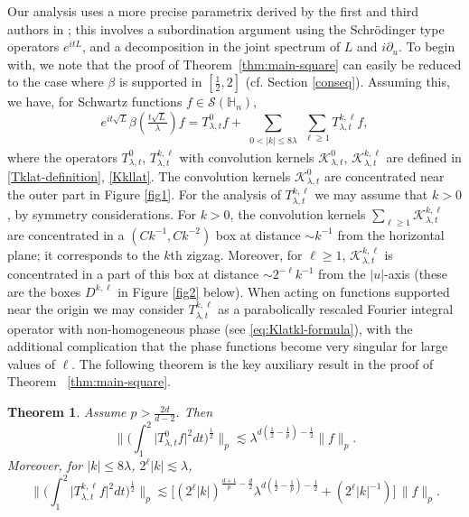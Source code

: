 \documentclass[leqno]{amsart}
\newtheorem{theorem}{Theorem}[section]
\theoremstyle{definition}
\theoremstyle{remark}
\numberwithin{equation}{section}
\newcommand\lc{\lesssim}
\newcommand\la{{\lambda}}
\newcommand\bbH{{\mathbb {H}}}
\newcommand\cS{{\mathcal {S}}}
\newcommand\sK{{\mathscr {K}}}
\begin{document}
Our analysis uses a more precise parametrix derived by the first and third authors in \cite{MuellerSeeger2015}; this involves a subordination argument using the Schrödinger type operators $e^{itL}$, and a decomposition in the joint spectrum of $L$ and $i\partial_u$. To begin with, we note that the proof of Theorem~\ref{thm:main-square} can easily be reduced to the case where $\beta$ is supported in $[\frac12,2]$ (cf. Section \ref{conseq}). Assuming this,  we have, for Schwartz functions $f\in \cS(\bbH_n)$,
\begin{equation}\label{eq:wavedec} e^{i t\sqrt{L}} \beta(\tfrac{t\sqrt{L}}{\la}) f= T^0_{\la,t}f +
\sum_{\substack {0<|k|\le 8\lambda} } \sum_{\ell\ge 1} T^{k,\ell}_{\la,t} f,
\end{equation}
where the  operators $T^0_{\la,t}$, $T^{k,\ell}_{\la,t}$ with convolution kernels $\sK^0_{\la,t}$, $\sK^{k,\ell}_{\la,t}$ are defined in  \eqref{Tklat-definition}, \eqref{Kkllat}.
The convolution kernels $\sK^0_{\la,t}$ are concentrated near the outer part in Figure \ref{fig1}. For the analysis of $T^{k,\ell}_{\la,t}$ we may assume that $k>0$, by symmetry considerations. 
For $k>0$,  the convolution kernels  $\sum_{\ell\ge 1} \sK_{\la,t}^{k,\ell}$  are concentrated  in a
$(Ck^{-1}, Ck^{-2} )$ box at distance $\sim k^{-1}$  from the horizontal plane; it corresponds to the $k$th zigzag. Moreover, for $\ell\ge 1$,  $\sK_{\la,t}^{k,\ell}$ is concentrated in a  part of this box at distance $\sim 2^{-\ell} k^{-1}$ from the $|u|$-axis (these are the boxes $D^{k,\ell}$ in Figure \ref{fig2} below). 
When acting on functions supported near the origin we may  consider $T^{k,\ell}_{\la,t}$ as a parabolically rescaled Fourier integral operator with non-homogeneous phase (see \eqref{eq:Klatkl-formula}), with the additional complication that the phase functions  become very singular for large values of $\ell$. The following theorem 
is  the key auxiliary result in the proof of Theorem~
\ref{thm:main-square}. 
\begin{theorem} \label{mainTklthm}
Assume $p>\frac{2d}{d-2}$.  Then 
\begin{equation} \label{eq:T0la-sq}
\Big\| \Big(\int_1^2 \big| T^{0}_{\la,t} f\big|^2 dt\Big)^{\frac 1 2} \Big\|_p \lc  \la^{d(\frac 12-\frac 1p)-\frac 12} \|f\|_p.
\end{equation}
Moreover, for $|k|\le 8\la$, $2^\ell|k|\lc \la$,
\begin{equation} \label{eq:Tkla-sq}
\Big\| \Big(\int_1^2 \big| T^{k,\ell}_{\la,t} f\big|^2 dt\Big)^{\frac 1 2} \Big\|_p \lc \big[ (2^\ell |k|)^{\frac{d+1}{p}-\frac d2} \la^{d(\frac 12-\frac 1p)-\frac 12}  +(2^\ell |k|^{-1}) \big] \, \|f\|_p.
\end{equation}
\end{theorem} 
\end{document}
